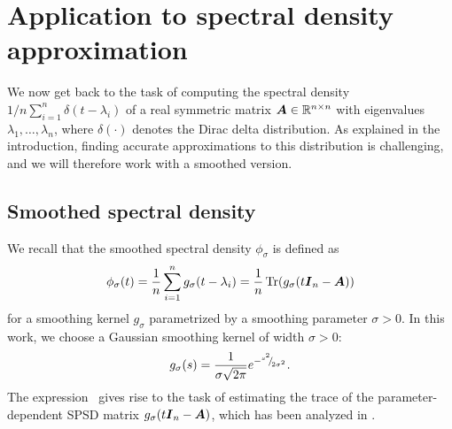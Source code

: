 
\section{Application to spectral density approximation}
\label{sec:application}

We now get back to the task of computing the spectral density $1/n \sum_{i=1}^{n} \delta(t - \lambda_i)$ of a real symmetric matrix $\boldsymbol{A} \in \mathbb{R}^{n \times n}$ with eigenvalues $\lambda_1, \dots, \lambda_n$, where $\delta(\cdot)$ denotes the Dirac delta distribution. As explained in the introduction, finding accurate approximations to this distribution is challenging, and we will therefore work with
a smoothed version. %

\subsection{Smoothed spectral density}
\label{subsec:spectral-density}

We recall that the smoothed spectral density $\phi_{\sigma}$ is defined as
\begin{equation}
    \phi_{\sigma}(t) = \frac{1}{n} \sum_{i=1}^{n} g_{\sigma}(t - \lambda_i) = \frac{1}{n} \operatorname{Tr}(g_{\sigma}(t\boldsymbol{I}_n - \boldsymbol{A}))
    \label{equ:smooth-spectral-density}
\end{equation}
for a smoothing kernel $g_{\sigma}$ parametrized by a smoothing parameter $\sigma > 0$. In this work, we choose a Gaussian smoothing kernel of width $\sigma > 0$:
\begin{equation}
    g_{\sigma}(s) = \frac{1}{\sigma \sqrt{2\pi}} e^{-{}^{s^2}{\mskip -5mu/\mskip -3mu}_{2\sigma^2}}.
    \label{equ:smoothing-kernel}
\end{equation}
The expression~ gives rise to the task of estimating the trace of the parameter-dependent SPSD matrix $g_{\sigma}(t\boldsymbol{I}_n - \boldsymbol{A})$, which has been analyzed in .

